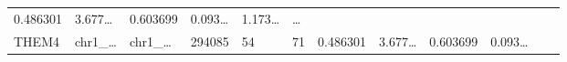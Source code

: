 \documentclass[
]{article}
\begin{document}
\begin{longtable}[]{@{}llllllllllll@{}}
\begin{minipage}[t]{0.06\columnwidth}
0.486301\strut
\end{minipage} & \begin{minipage}[t]{0.08\columnwidth}\raggedright
3.677\ldots{}\strut
\end{minipage} & \begin{minipage}[t]{0.06\columnwidth}\raggedright
0.603699\strut
\end{minipage} & \begin{minipage}[t]{0.06\columnwidth}\raggedright
0.093\ldots{}\strut
\end{minipage} & \begin{minipage}[t]{0.09\columnwidth}\raggedright
1.173\ldots{}\strut
\end{minipage} & \begin{minipage}[t]{0.02\columnwidth}\raggedright
\ldots{}\strut
\end{minipage}\tabularnewline
\begin{minipage}[t]{0.06\columnwidth}\raggedright
THEM4\strut
\end{minipage} & \begin{minipage}[t]{0.06\columnwidth}\raggedright
chr1\_\ldots{}\strut
\end{minipage} & \begin{minipage}[t]{0.06\columnwidth}\raggedright
chr1\_\ldots{}\strut
\end{minipage} & \begin{minipage}[t]{0.06\columnwidth}\raggedright
294085\strut
\end{minipage} & \begin{minipage}[t]{0.06\columnwidth}\raggedright
54\strut
\end{minipage} & \begin{minipage}[t]{0.06\columnwidth}\raggedright
71\strut
\end{minipage} & \begin{minipage}[t]{0.06\columnwidth}\raggedright
0.486301\strut
\end{minipage} & \begin{minipage}[t]{0.08\columnwidth}\raggedright
3.677\ldots{}\strut
\end{minipage} & \begin{minipage}[t]{0.06\columnwidth}\raggedright
0.603699\strut
\end{minipage} & \begin{minipage}[t]{0.06\columnwidth}\raggedright
0.093\ldots{}\strut
\end{minipage} & \begin{minipage}[t]{0.09\columnwidth}\raggedright

\end{minipage}
\end{longtable}
\end{document}
